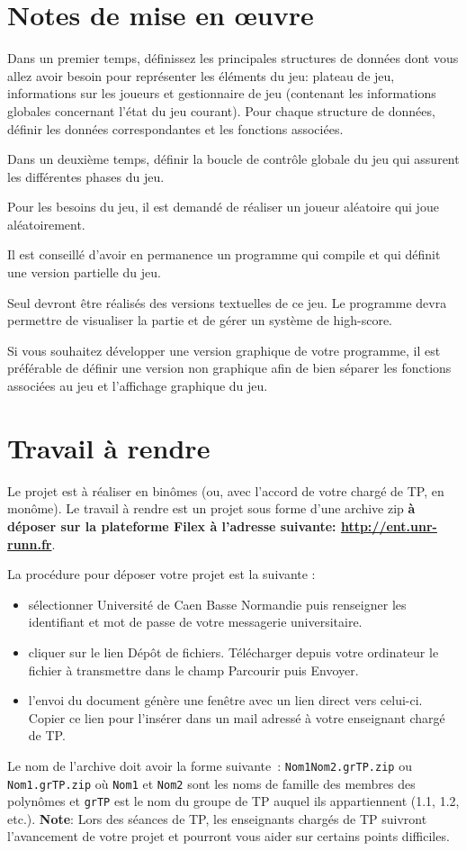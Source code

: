\documentclass[10pt]{article}
\begin{document}
\section{Notes de mise en {\oe}uvre}

Dans un premier temps, définissez les principales structures de données dont vous allez avoir besoin pour représenter les éléments du jeu: plateau de jeu, informations sur les joueurs et gestionnaire de jeu (contenant les informations globales concernant l'état du jeu courant). Pour chaque structure de données, définir les données correspondantes et les fonctions associées.

Dans un deuxième temps, définir la boucle de contrôle globale du jeu qui assurent les différentes phases du jeu.

Pour les besoins du jeu, il est demandé de réaliser un joueur aléatoire qui joue aléatoirement.

Il est conseillé d'avoir en permanence un programme qui compile et qui définit une version partielle du jeu.

Seul devront être réalisés des versions textuelles de ce jeu. Le programme devra permettre de visualiser la partie et de gérer un système de high-score.

Si vous souhaitez développer une version graphique de votre programme, il est préférable de définir une version non graphique afin de bien séparer les fonctions associées au jeu et l'affichage graphique du jeu.

\section{Travail à rendre}
Le projet est à réaliser en binômes (ou, avec l'accord de votre chargé de TP, en monôme). Le travail à rendre est un projet sous forme d'une archive zip {\bf à déposer sur la plateforme Filex à l'adresse suivante: \url{http://ent.unr-runn.fr}}. 

La procédure pour déposer votre projet est la suivante :
\begin{itemize}
\item sélectionner Université de Caen Basse Normandie puis renseigner les identifiant et mot de passe de votre messagerie universitaire.
\item cliquer sur le lien Dépôt de fichiers. Télécharger depuis votre ordinateur le fichier à transmettre dans le champ Parcourir puis Envoyer. 
\item l'envoi du document génère une fenêtre avec un lien direct vers celui-ci. Copier ce lien pour l'insérer dans un mail adressé à votre enseignant chargé de TP. 
\end{itemize}
\noindent
Le nom de l'archive doit avoir la forme suivante~: \texttt{Nom1Nom2.grTP.zip} ou 
\texttt{Nom1.grTP.zip} où \texttt{Nom1} et \texttt{Nom2} sont les noms de 
famille des membres des polynômes et \texttt{grTP} est le nom du groupe de TP 
auquel ils appartiennent (1.1, 1.2, etc.).
\noindent
{\bf Note}: Lors des séances de TP, les enseignants chargés de TP suivront l'avancement de votre projet et pourront vous aider sur certains points difficiles.
\end{document}
